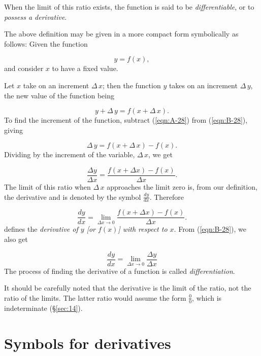 When the limit of this ratio exists, the function is said to be 
{\it differentiable}, or to {\it possess a derivative}.


The above definition may be given in a more compact form 
symbolically as follows: Given the function

\begin{equation}
y = f(x),
\label{eqn:A-28}
\end{equation}
and consider $x$ to have a fixed value.

Let $x$ take on an increment $\Delta\, x$; then the function $y$ takes on an 
increment $\Delta\, y$, the new value of the function being

\begin{equation}
y + \Delta\, y = f(x + \Delta\, x).
\label{eqn:B-28}
\end{equation}
To find the increment of the function, subtract %
(\ref{eqn:A-28}) from (\ref{eqn:B-28}), %
giving

\[
\Delta\, y = f(x + \Delta\, x) - f(x).
\]
Dividing by the increment of the variable, $\Delta\, x$, we get

\begin{equation}
\frac{\Delta y}{\Delta x} = \frac{f(x + \Delta x) - f(x)}{\Delta x}.
\label{eqn:D-28}
\end{equation}
The limit of this ratio when $\Delta\, x$ approaches the limit 
zero is, from our definition, the derivative and is denoted 
by the symbol $\frac{dy}{dx}$.
Therefore

\[
\frac{dy}{dx} = \lim_{\Delta x \to 0} \frac{f(x + \Delta x) - f(x)}{\Delta x}.
\]
defines the {\it derivative of $y$ [or $f(x)$] with respect to $x$}.
From %
(\ref{eqn:B-28}), %
we also get

\[
    \frac{dy}{dx} = \lim_{\Delta x \to 0} \frac{\Delta y}{\Delta x}
\]
The process of finding the derivative of a function is called {\it differentiation}.

It should be carefully noted that the derivative is the limit of the 
ratio, not the ratio of the limits. The latter ratio would assume the 
form $\frac{0}{0}$, which is indeterminate (\S \ref{sec:14}).


\section{Symbols for derivatives}

